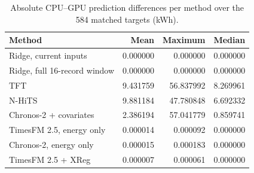\begin{table}[!htbp]\centering\small
\caption{Absolute CPU--GPU prediction differences per method over the 584 matched targets (kWh).}\label{tab:s_numdiff}
\begin{tabular}{@{}lrrr@{}}\toprule
Method & Mean & Maximum & Median \\\midrule
Ridge, current inputs & 0.000000 & 0.000000 & 0.000000 \\
Ridge, full 16-record window & 0.000000 & 0.000000 & 0.000000 \\
TFT & 9.431759 & 56.837992 & 8.269961 \\
N-HiTS & 9.881184 & 47.780848 & 6.692332 \\
Chronos-2 + covariates & 2.386194 & 57.041779 & 0.859741 \\
TimesFM 2.5, energy only & 0.000014 & 0.000092 & 0.000000 \\
Chronos-2, energy only & 0.000015 & 0.000183 & 0.000000 \\
TimesFM 2.5 + XReg & 0.000007 & 0.000061 & 0.000000 \\
\bottomrule
\end{tabular}
\end{table}

